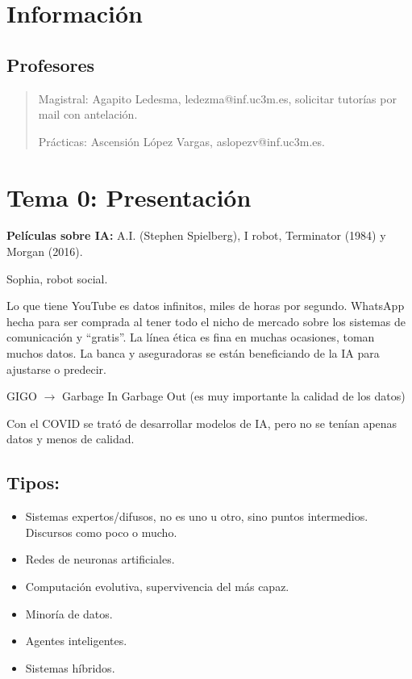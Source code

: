\documentclass[12pt, twoside, openright]{report} %
\begin{document}
\listoffigures
\thispagestyle{fancy}

\listoftables
\thispagestyle{fancy}





\chapter{Información}

\section{Profesores}
\begin{quote}
	Magistral: Agapito Ledesma, ledezma@inf.uc3m.es, solicitar tutorías por mail con antelación.

	Prácticas: Ascensión López Vargas, aslopezv@inf.uc3m.es.
\end{quote}

\chapter{Tema 0: Presentación}

\textbf{Películas sobre IA:} A.I. (Stephen Spielberg), I robot, Terminator (1984) y Morgan (2016).

Sophia, robot social.

Lo que tiene YouTube es datos infinitos, miles de horas por segundo.
WhatsApp hecha para ser comprada al tener todo el nicho de mercado sobre los sistemas de comunicación y “gratis”.
La línea ética es fina en muchas ocasiones, toman muchos datos. La banca y aseguradoras se están beneficiando de la IA para ajustarse o predecir.

GIGO $\rightarrow$ Garbage In Garbage Out (es muy importante la calidad de los datos)

Con el COVID se trató de desarrollar modelos de IA, pero no se tenían apenas datos y menos de calidad.

\section{Tipos:}
\begin{itemize}
	\item Sistemas expertos/difusos, no es uno u otro, sino puntos intermedios. Discursos como poco o mucho.
	\item Redes de neuronas artificiales.
	\item Computación evolutiva, supervivencia del más capaz.
	\item Minoría de datos.
	\item Agentes inteligentes.
	\item Sistemas híbridos.
\end{itemize}
\end{document}
